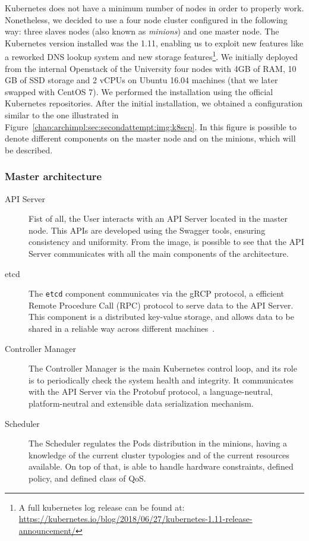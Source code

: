 Kubernetes does not have a minimum number of nodes in order to properly work.
Nonetheless, we decided to use a four node cluster configured in the following
way: three slaves nodes (also known as \emph{minions}) and one master node. The
Kubernetes version installed was the 1.11, enabling us to exploit new features
like a reworked DNS lookup system and new storage features\footnote{A full
  kubernetes log release can be found at:
  \url{https://kubernetes.io/blog/2018/06/27/kubernetes-1.11-release-announcement/}}.
We initially deployed from the internal Openstack of the University four nodes
with 4GB of RAM, 10 GB of SSD storage and 2 vCPUs on Ubuntu 16.04 machines (that
we later swapped with CentOS 7). We performed the installation using the
official Kubernetes repositories. After the initial installation, we obtained a
configuration similar to the one illustrated in
Figure~\ref{chap:archimpl:sec:secondattempt:img:k8scp}. In this figure is
possible to denote different components on the master node and on the minions,
which will be described.

\subsubsection{Master architecture}
\begin{description}
\item[API Server] Fist of all, the User interacts with an API Server located in
  the master node. This APIs are developed using the Swagger tools, ensuring
  consistency and uniformity. From the image, is possible to see that the API
  Server communicates with all the main components of the architecture.
\item[etcd] The \verb!etcd! component communicates via the gRCP protocol, a
  efficient Remote Procedure Call (RPC) protocol to serve data to the API
  Server. This component is a distributed key-value storage, and allows data to
  be shared in a reliable way across different machines~\cite{etcddatamodel}.
\item[Controller Manager] The Controller Manager is the main Kubernetes control
  loop, and its role is to periodically check the system health and integrity.
  It communicates with the API Server via the Protobuf protocol, a
  language-neutral, platform-neutral and extensible data serialization
  mechanism.
\item[Scheduler] The Scheduler regulates the Pods distribution in the minions,
  having a knowledge of the current cluster typologies and of the current
  resources available. On top of that, is able to handle hardware constraints,
  defined policy, and defined class of QoS.
\end{description}

